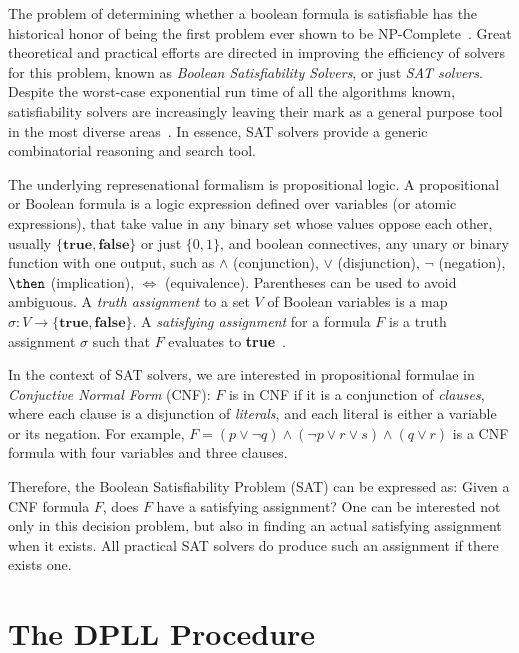 The problem of determining whether a boolean formula is satisfiable has the
historical honor of being the first problem ever shown to be
NP-Complete~\cite{Cook}. Great theoretical and practical efforts are directed
in improving the efficiency of solvers for this problem, known as \emph{Boolean
Satisfiability Solvers}, or just \emph{SAT solvers}. Despite the worst-case
exponential run time of all the algorithms known, satisfiability solvers are
increasingly leaving their mark as a general purpose tool in the most diverse
areas~\cite{satchapter}. In essence, SAT solvers provide a generic combinatorial
reasoning and search tool. 

The underlying represenational formalism is propositional logic. A propositional
or Boolean formula is a logic expression defined over variables (or atomic
expressions), that take value in any binary set whose values oppose each other,
usually $\{\textbf{true}, \textbf{false}\}$ or just $\{0,1\}$, and boolean
connectives, any unary or binary function with one output, such as
$\land$ (conjunction), $\lor$ (disjunction), $\neg$ (negation), $\then$
(implication), $\iff$ (equivalence). Parentheses can be used to avoid ambiguous.
A \emph{truth assignment} to a set $V$ of Boolean variables is a map $\sigma : V
\rightarrow \{\textbf{true}, \textbf{false}\}$. A \emph{satisfying assignment}
for a formula $F$ is a truth assignment $\sigma$ such that $F$ evaluates to
\textbf{true}~\cite{satchapter}.

In the context of SAT solvers, we are interested in propositional formulae in
\emph{Conjuctive Normal Form} (CNF): $F$ is in CNF if it is a conjunction of
\emph{clauses}, where each clause is a disjunction of \emph{literals}, and each
literal is either a variable or its negation. For example, $F = (p \lor \neg q)
\land (\neg p \lor r \lor s) \land (q \lor r)$ is a CNF formula with four variables and
three clauses.

Therefore, the Boolean Satisfiability Problem (SAT) can be expressed as: Given a
CNF formula $F$, does $F$ have a satisfying assignment? One can be interested
not only in this decision problem, but also in finding an actual satisfying
assignment when it exists. All practical SAT solvers do produce such an
assignment if there exists one.

\section{The DPLL Procedure}
\label{sec:dpll}

